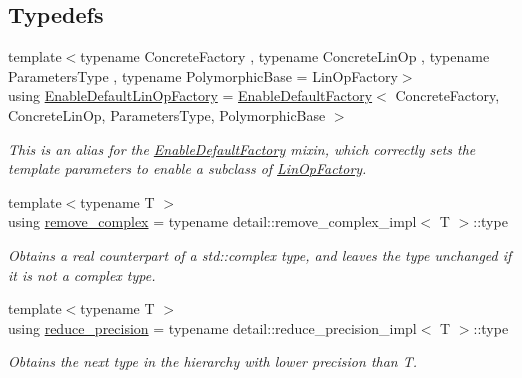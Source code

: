 \subsection*{Typedefs}
\begin{DoxyCompactItemize}
\item 
{\footnotesize template$<$typename Concrete\+Factory , typename Concrete\+Lin\+Op , typename Parameters\+Type , typename Polymorphic\+Base  = Lin\+Op\+Factory$>$ }\\using \hyperlink{group__LinOp_ga24628d477cba68b31cea690572c51912}{Enable\+Default\+Lin\+Op\+Factory} = \hyperlink{classgko_1_1EnableDefaultFactory}{Enable\+Default\+Factory}$<$ Concrete\+Factory, Concrete\+Lin\+Op, Parameters\+Type, Polymorphic\+Base $>$
\begin{DoxyCompactList}\small\item\em This is an alias for the \hyperlink{classgko_1_1EnableDefaultFactory}{Enable\+Default\+Factory} mixin, which correctly sets the template parameters to enable a subclass of \hyperlink{classgko_1_1LinOpFactory}{Lin\+Op\+Factory}. \end{DoxyCompactList}\item 
\mbox{\label{namespacegko_adfcb75c44f6b6c701989419c166f6e7e}} 
{\footnotesize template$<$typename T $>$ }\\using \hyperlink{namespacegko_adfcb75c44f6b6c701989419c166f6e7e}{remove\+\_\+complex} = typename detail\+::remove\+\_\+complex\+\_\+impl$<$ T $>$\+::type
\begin{DoxyCompactList}\small\item\em Obtains a real counterpart of a std\+::complex type, and leaves the type unchanged if it is not a complex type. \end{DoxyCompactList}\item 
\mbox{\label{namespacegko_ab5d71c1f4bd1b654df1e561ea7a811f2}} 
{\footnotesize template$<$typename T $>$ }\\using \hyperlink{namespacegko_ab5d71c1f4bd1b654df1e561ea7a811f2}{reduce\+\_\+precision} = typename detail\+::reduce\+\_\+precision\+\_\+impl$<$ T $>$\+::type
\begin{DoxyCompactList}\small\item\em Obtains the next type in the hierarchy with lower precision than T. \end{DoxyCompactList}\item 
\mbox{\label{namespacegko_a373c2b4782d95e675d7e91a75bab101d}} 

\end{DoxyCompactItemize}

